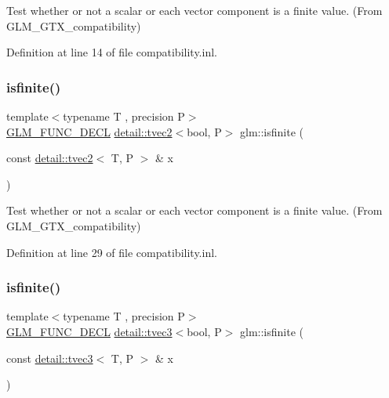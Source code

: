 Test whether or not a scalar or each vector component is a finite value. (From G\+L\+M\+\_\+\+G\+T\+X\+\_\+compatibility) 



Definition at line 14 of file compatibility.\+inl.

\mbox{\label{group__gtx__compatibility_ga604f38239da3a5b5b1e4fe06dec7f64d}} 
\subsubsection{\texorpdfstring{isfinite()}{isfinite()}\hspace{0.1cm}{\footnotesize\ttfamily [2/4]}}
{\footnotesize\ttfamily template$<$typename T , precision P$>$ \\
\hyperlink{setup_8hpp_ab2d052de21a70539923e9bcbf6e83a51}{G\+L\+M\+\_\+\+F\+U\+N\+C\+\_\+\+D\+E\+CL} \hyperlink{structglm_1_1detail_1_1tvec2}{detail\+::tvec2}$<$bool, P$>$ glm\+::isfinite (\begin{DoxyParamCaption}\item[{const \hyperlink{structglm_1_1detail_1_1tvec2}{detail\+::tvec2}$<$ T, P $>$ \&}]{x }\end{DoxyParamCaption})}



Test whether or not a scalar or each vector component is a finite value. (From G\+L\+M\+\_\+\+G\+T\+X\+\_\+compatibility) 



Definition at line 29 of file compatibility.\+inl.

\mbox{\label{group__gtx__compatibility_ga416b6078bffd22e3a56a5c5379ba2cf8}} 
\subsubsection{\texorpdfstring{isfinite()}{isfinite()}\hspace{0.1cm}{\footnotesize\ttfamily [3/4]}}
{\footnotesize\ttfamily template$<$typename T , precision P$>$ \\
\hyperlink{setup_8hpp_ab2d052de21a70539923e9bcbf6e83a51}{G\+L\+M\+\_\+\+F\+U\+N\+C\+\_\+\+D\+E\+CL} \hyperlink{structglm_1_1detail_1_1tvec3}{detail\+::tvec3}$<$bool, P$>$ glm\+::isfinite (\begin{DoxyParamCaption}\item[{const \hyperlink{structglm_1_1detail_1_1tvec3}{detail\+::tvec3}$<$ T, P $>$ \&}]{x }\end{DoxyParamCaption})}



